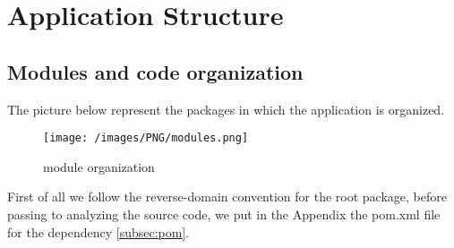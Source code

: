 %
%
\chapter{Application Structure}

\section{Modules and code organization}
\justifying
The picture below represent the packages in which the application is organized.
\begin{figure}[H]
\begin{center}
\texttt{[image: /images/PNG/modules.png]}
\caption{module organization}
\end{center}
\end{figure}
First of all we follow the reverse-domain convention for the root package, before passing to analyzing the source code, we put in the Appendix the pom.xml file for the dependency \cref{subsec:pom}.

